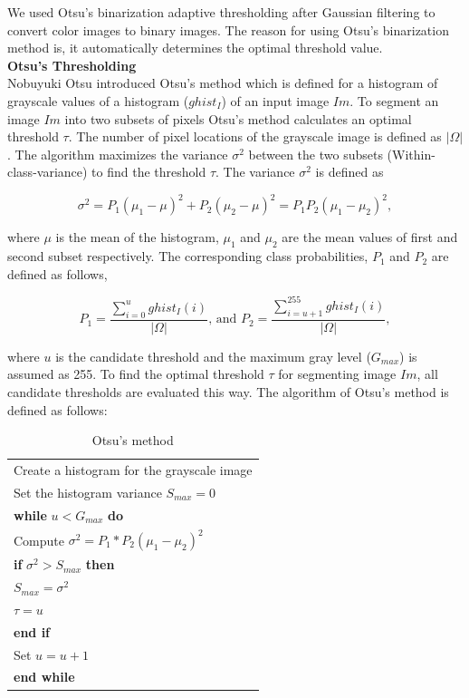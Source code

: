\documentclass{article}
\begin{document}
We used Otsu's binarization
adaptive thresholding after Gaussian filtering to convert color images
to binary images. The reason for using Otsu's binarization method
is, it automatically determines the optimal threshold value.\\

\textbf{Otsu's Thresholding}\\

Nobuyuki Otsu introduced Otsu's method which is defined for a
histogram of grayscale values of a histogram (\(ghist_I\)) of an input
image \(Im\). To segment an image \(Im\) into two subsets of pixels
Otsu's method calculates an optimal threshold \(\tau\). The number of
pixel locations of the grayscale image is defined as \(|\Omega|\). The
algorithm maximizes the variance \(\sigma^2\) between the two subsets
(Within-class-variance) to find the threshold \(\tau\). The variance
\(\sigma^2\) is defined as

\[\sigma^2 = P_1(\mu_1-\mu)^2 + P_2(\mu_2-\mu)^2 = P_1P_2(\mu_1-\mu_2)^2, \]

where \(\mu\) is the mean of the histogram, \(\mu_1\) and \(\mu_2\) are
the mean values of first and second subset respectively. The
corresponding class probabilities, \(P_1\) and \(P_2\) are defined as
follows,

\[P_1 = \frac{\sum_{i=0}^{u}ghist_I(i)}{|\Omega|} \text{, and } P_2 = \frac{\sum_{i=u+1}^{255}ghist_I(i)}{|\Omega|},\]

where \(u\) is the candidate threshold and the maximum gray level
(\(G_{max}\)) is assumed as 255. To find the optimal threshold \(\tau\) for
segmenting image \(Im\), all candidate thresholds are evaluated this
way. The algorithm of Otsu's method is defined as follows:

\begin{table}[!ht]
\centering
\begin{tabular}{l}
\hline
Create a histogram for the grayscale image \\ 
Set the histogram variance $S_{max} = 0$                                             \\ \hline
\textbf{while} $u < G_{max}$ \textbf{do}                                             \\ \hline
Compute $\sigma^2 = P_1*P_2(\mu_1-\mu_2)^2$                                             \\ 
\textbf{if} $\sigma^2 > S_{max}$ \textbf{then}                                             \\ \hline
$S_{max} = \sigma^2$                                             \\
$\tau = u$                                             \\ \hline
\textbf{end if}                                             \\ 
Set $u = u+1$                                             \\ \hline
\textbf{end while}                                             \\ \hline
\end{tabular}
\caption{Otsu's method}
\label{tab:ot}
\end{table}
\end{document}
